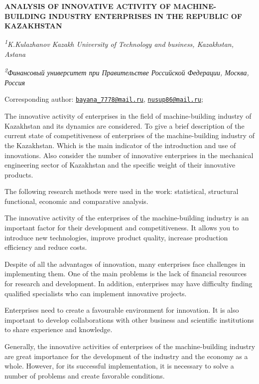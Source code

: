 
{\bfseries ANALYSIS OF INNOVATIVE ACTIVITY OF MACHINE-BUILDING INDUSTRY
ENTERPRISES IN THE REPUBLIC OF KAZAKHSTAN}



\emph{\textsuperscript{1}K.Kulazhanov Kazakh University of Technology
and business, Kazakhstan, Astana}

\emph{\textsuperscript{2}Финансовый университет при Правительстве
Российской Федерации, Москва, Россия}

{\bfseries \textsuperscript{\envelope }}Corresponding author:
\href{mailto:bayana_7778@mail.ru}{\nolinkurl{bayana\_7778@mail.ru}},
\href{mailto:nusup86@mail.ru}{\nolinkurl{nusup86@mail.ru}};

The innovative activity of enterprises in the field of machine-building
industry of Kazakhstan and its dynamics are considered. To give a brief
description of the current state of competitiveness of enterprises of
the machine-building industry of the Kazakhstan. Which is the main
indicator of the introduction and use of innovations. Also consider the
number of innovative enterprises in the mechanical engineering sector of
Kazakhstan and the specific weight of their innovative products.

The following research methods were used in the work: statistical,
structural functional, economic and comparative analysis.

The innovative activity of the enterprises of the machine-building
industry is an important factor for their development and
competitiveness. It allows you to introduce new technologies, improve
product quality, increase production efficiency and reduce costs.

Despite of all the advantages of innovation, many enterprises face
challenges in implementing them. One of the main problems is the lack of
financial resources for research and development. In addition,
enterprises may have difficulty finding qualified specialists who can
implement innovative projects.

Enterprises need to create a favourable environment for innovation. It
is also important to develop collaborations with other business and
scientific institutions to share experience and knowledge.

Generally, the innovative activities of enterprises of the
machine-building industry are great importance for the development of
the industry and the economy as a whole. However, for its successful
implementation, it is necessary to solve a number of problems and create
favorable conditions.

